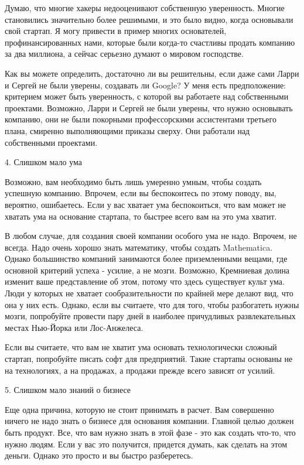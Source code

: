 \documentclass[ebook,12pt,oneside,openany]{memoir}
\begin{document}
Думаю, что многие хакеры недооценивают собственную уверенность. Многие
становились значительно более решимыми, и это было видно, когда
основывали свой стартап. Я могу привести в пример многих основателей,
профинансированных нами, которые были когда-то счастливы продать
компанию за два миллиона, а сейчас серьезно думают о мировом
господстве.

Как вы можете определить, достаточно ли вы решительны, если даже сами
Ларри и Сергей не были уверены, создавать ли Google? У меня есть
предположение: критерием может быть уверенность, с которой вы
работаете над собственными проектами. Возможно, Ларри и Сергей не были
уверены, что нужно основывать компанию, они не были покорными
профессорскими ассистентами третьего плана, смиренно выполняющими
приказы сверху. Они работали над собственными проектами.

4. Слишком мало ума

Возможно, вам необходимо быть лишь умеренно умным, чтобы создать
успешную компанию. Впрочем, если вы беспокоитесь по этому поводу, вы,
вероятно, ошибаетесь. Если у вас хватает ума беспокоиться, что вам
может не хватать ума на основание стартапа, то быстрее всего вам на
это ума хватит.

В любом случае, для создания своей компании особого ума не надо.
Впрочем, не всегда. Надо очень хорошо знать математику, чтобы создать
Mathematica. Однако большинство компаний занимаются более
приземленными вещами, где основной критерий успеха - усилие, а не
мозги. Возможно, Кремниевая долина изменит ваше представление об этом,
потому что здесь существует культ ума. Люди у которых не хватает
сообразительности по крайней мере делают вид, что она у них есть.
Однако, если вы считаете, что для того, чтобы разбогатеть нужны мозги,
попробуйте провести пару дней в наиболее причудливых развлекательных
местах Нью-Йорка или Лос-Анжелеса.

Если вы считаете, что вам не хватит ума основать технологически
сложный стартап, попробуйте писать софт для предприятий. Такие
стартапы основаны не на технологиях, а на продажах, а продажи прежде
всего зависят от усилий.

5. Слишком мало знаний о бизнесе

Еще одна причина, которую не стоит принимать в расчет. Вам совершенно
ничего не надо знать о бизнесе для основания компании. Главной целью
должен быть продукт. Все, что вам нужно знать в этой фазе - это как
создать что-то, что нужно людям. Если у вас это получится, придется
думать, как сделать на этом деньги. Однако это просто и вы быстро
разберетесь.
\end{document}
